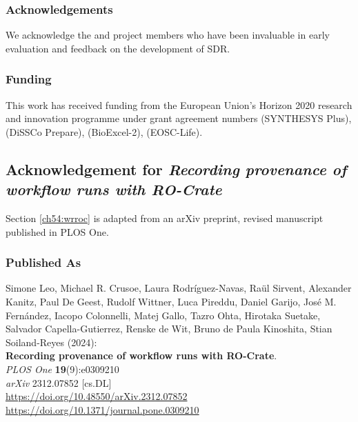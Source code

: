 \subsubsection*{Acknowledgements}

We acknowledge the  and
 project members who have been
invaluable in early evaluation and feedback on the development of SDR.

\subsubsection*{Funding}

This work has received funding from the European Union's Horizon 2020
research and innovation programme under grant agreement numbers
(SYNTHESYS Plus),  (DiSSCo
Prepare),  (BioExcel-2),
 (EOSC-Life).



\subsection{Acknowledgement for \emph{Recording provenance of workflow runs with RO-Crate}}
\label{ch11:wrroc}

Section \vref{ch54:wrroc} is adapted from an arXiv preprint, revised manuscript published in PLOS One.

\subsubsection*{Published As}

Simone Leo, Michael R. Crusoe, Laura Rodríguez-Navas, Raül Sirvent, Alexander Kanitz, Paul De Geest, Rudolf Wittner, Luca Pireddu, Daniel Garijo, José M. Fernández, Iacopo Colonnelli, Matej Gallo, Tazro Ohta, Hirotaka Suetake, Salvador Capella-Gutierrez, Renske de Wit, Bruno de Paula Kinoshita, Stian Soiland-Reyes (2024): \\
\textbf{Recording provenance of workflow runs with RO-Crate}.\\
\emph{PLOS One} \textbf{19}(9):e0309210 \\
\emph{arXiv} 2312.07852 [cs.DL] \\
\url{https://doi.org/10.48550/arXiv.2312.07852} \\
\url{https://doi.org/10.1371/journal.pone.0309210}

